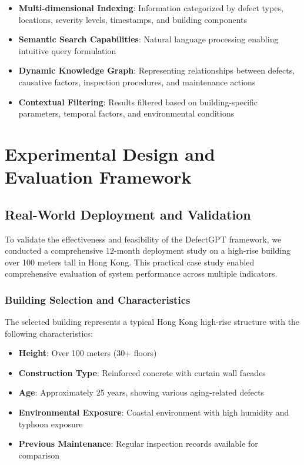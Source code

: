 \begin{itemize}
    \item \textbf{Multi-dimensional Indexing}: Information categorized by defect types, locations, severity levels, timestamps, and building components
    \item \textbf{Semantic Search Capabilities}: Natural language processing enabling intuitive query formulation
    \item \textbf{Dynamic Knowledge Graph}: Representing relationships between defects, causative factors, inspection procedures, and maintenance actions
    \item \textbf{Contextual Filtering}: Results filtered based on building-specific parameters, temporal factors, and environmental conditions
\end{itemize}

\section{Experimental Design and Evaluation Framework}

\subsection{Real-World Deployment and Validation}

To validate the effectiveness and feasibility of the DefectGPT framework, we conducted a comprehensive 12-month deployment study on a high-rise building over 100 meters tall in Hong Kong. This practical case study enabled comprehensive evaluation of system performance across multiple indicators.

\subsubsection{Building Selection and Characteristics}

The selected building represents a typical Hong Kong high-rise structure with the following characteristics:

\begin{itemize}
    \item \textbf{Height}: Over 100 meters (30+ floors)
    \item \textbf{Construction Type}: Reinforced concrete with curtain wall facades
    \item \textbf{Age}: Approximately 25 years, showing various aging-related defects
    \item \textbf{Environmental Exposure}: Coastal environment with high humidity and typhoon exposure
    \item \textbf{Previous Maintenance}: Regular inspection records available for comparison
\end{itemize}

